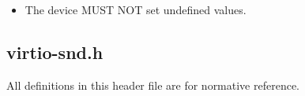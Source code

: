 
\begin{itemize}
\item The device MUST NOT set undefined  values.
\end{itemize}

\subsection[virtio-snd.h]{virtio-snd.h}\label{sec:virtio-snd.h}
\label{sec:virtio-snd.h}
All definitions in this header file are for normative reference.

